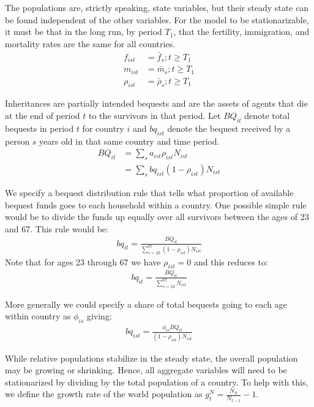 \documentclass[letterpaper,12pt]{article}
\theoremstyle{definition}
\numberwithin{equation}{section}
\begin{document}
\begin{spacing}{1.5}
	The populations are, strictly speaking, state variables, but their steady state can be found independent of the other variables.  For the model to be stationarizable, it must be that in the long run, by period $T_1$, that the fertility, immigration, and mortality rates are the same for all countries.
	\begin{align}
		f_{ist} & = \bar f_s; t \ge T_1 \\
		m_{ist} & = \bar m_s; t \ge T_1 \\
		\rho_{ist} & = \bar \rho_s; t \ge T_1
	\end{align}

	Inheritances are partially intended bequests and are the assets of agents that die at the end of period $t$ to the survivors in that period.  Let $BQ_{it}$ denote total bequests in period $t$ for country $i$ and $bq_{ist}$ denote the bequest received by a person $s$ years old in that same country and time period.
	\begin{align}
		BQ_{it} & = \sum_s a_{ist} \rho_{ist} N_{ist} \\
		& = \sum_s bq_{ist} (1-\rho_{ist}) N_{ist}
	\end{align}

	We specify a bequest distribution rule that tells what proportion of available bequest funds goes to each household within a country.  One possible simple rule would be to divide the funds up equally over all survivors between the ages of 23 and 67.  This rule would be:
	\begin{align}
		bq_{it} = \frac{BQ_{it}}{\sum_{s=23}^{67} (1-\rho_{ist}) N_{ist}} \nonumber
	\end{align}
	Note that for ages 23 through 67 we have $\rho_{ist} = 0$ and this reduces to:
	\begin{align}
		bq_{it} = \frac{BQ_{it}}{\sum_{s=23}^{67} N_{ist}} \nonumber
	\end{align}

	More generally we could specify a share of total bequests going to each age within country as $\phi_{is}$ giving:
	\begin{align}
		bq_{ist} = \frac{\phi_{is} BQ_{it}}{(1-\rho_{ist})N_{ist}} \nonumber
	\end{align}

	While relative populations stabilize in the steady state, the overall population may be growing or shrinking.  Hence, all aggregate variables will need to be stationarized by dividing by the total population of a country.  To help with this, we define the growth rate of the world population as $g^N_t = \tfrac{N_{it}}{N_{t-1}}-1$.


\end{spacing}
\end{document}
